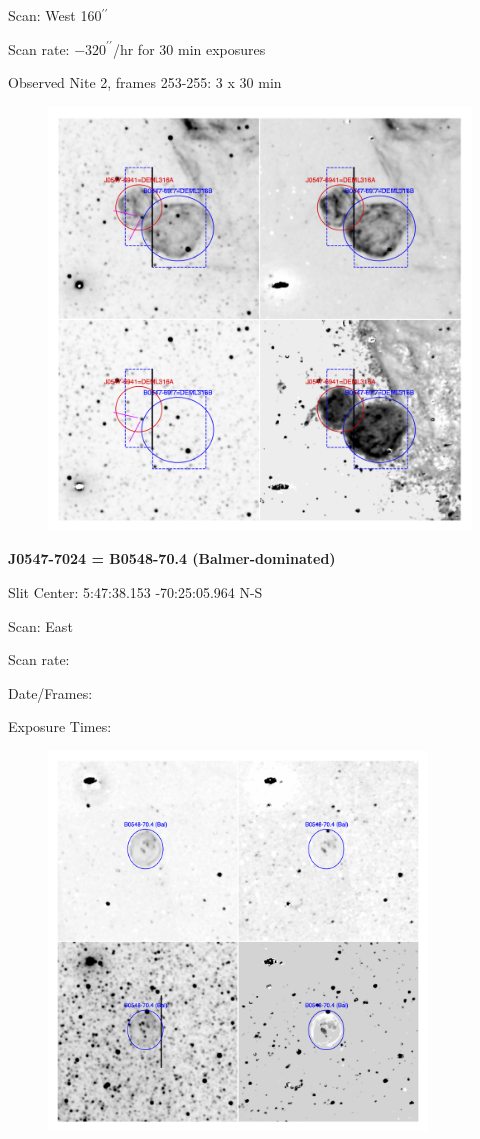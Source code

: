 \documentclass[11pt]{article}
\begin{document}
Scan:  West 160$^{\prime\prime}$

Scan rate:  $-320 ^{\prime\prime}$/hr for 30 min exposures

Observed Nite 2, frames 253-255:   3 x 30 min
\begin{figure}
\includegraphics[width=10.cm]{snapshots/DEML316ab.png}
\end{figure}

\newpage 
 
 
{\bf J0547-7024 = B0548-70.4 (Balmer-dominated)}

Slit Center:  5:47:38.153   -70:25:05.964  N-S

Scan:  East

Scan rate:  

Date/Frames:

Exposure Times:  

\begin{figure}
\includegraphics[width=10.05cm]{snapshots/B0548-704.png}
\end{figure}
\end{document}
